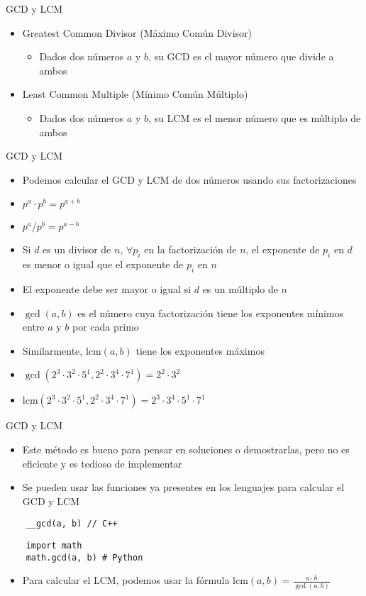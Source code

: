 \documentclass[10pt]{beamer}
\newcommand{\bi}{\begin{itemize}}
\newcommand{\ei}{\end{itemize}}
\begin{document}

\begin{frame}{GCD y LCM}
  \bi
    \item Greatest Common Divisor (Máximo Común Divisor)
    \bi
      \item Dados dos números $a$ y $b$, su GCD es el mayor número que divide a ambos
    \ei
    \item Least Common Multiple (Mínimo Común Múltiplo)
    \bi
      \item Dados dos números $a$ y $b$, su LCM es el menor número que es múltiplo de ambos
    \ei
  \ei
\end{frame}

\begin{frame}{GCD y LCM}
  \bi
    \item Podemos calcular el GCD y LCM de dos números usando sus factorizaciones
    \item $p^a \cdot p^b = p^{a+b}$
    \item $p^a / p^b = p^{a - b}$
    \item<2-> Si $d$ es un divisor de $n$, $\forall p_i$ en la factorización de $n$, el exponente de $p_i$ en $d$ es menor o igual que el exponente de $p_i$ en $n$
    \item<2-> El exponente debe ser mayor o igual si $d$ es un múltiplo de $n$
    \item<3-> $\gcd(a, b)$ es el número cuya factorización tiene los exponentes mínimos entre $a$ y $b$ por cada primo
    \item<3-> Similarmente, $\text{lcm}(a, b)$ tiene los exponentes máximos
    \item<4-> $\gcd(2^3 \cdot 3^2 \cdot 5^1, 2^2 \cdot 3^4 \cdot 7^1) = 2^2 \cdot 3^2$
    \item<4-> $\text{lcm}(2^3 \cdot 3^2 \cdot 5^1, 2^2 \cdot 3^4 \cdot 7^1) = 2^3 \cdot 3^4 \cdot 5^1 \cdot 7^1$
  \ei
\end{frame}

\begin{frame}[fragile]{GCD y LCM}
  \bi
    \item Este método es bueno para pensar en soluciones o demostrarlas, pero no es eficiente y es tedioso de implementar
    \item Se pueden usar las funciones ya presentes en los lenguajes para calcular el GCD y LCM
  \ei
  \begin{verbatim}
    __gcd(a, b) // C++
  \end{verbatim}
  \begin{verbatim}
    import math
    math.gcd(a, b) # Python
  \end{verbatim}
  \bi
    \item Para calcular el LCM, podemos usar la fórmula $\text{lcm}(a, b) = \frac{a \cdot b}{\gcd(a, b)}$
  \ei
\end{frame}
\end{document}
